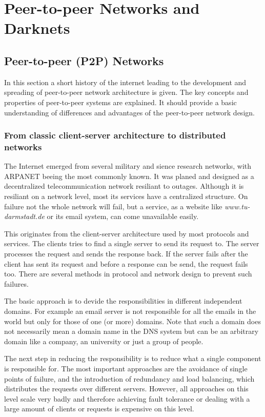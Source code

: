 \chapter{Peer-to-peer Networks and Darknets}


\section{Peer-to-peer (P2P) Networks}

In this section a short history of the internet leading to the development and spreading of peer-to-peer network architecture is given. The key concepts and properties of peer-to-peer systems are explained. It should provide a basic understanding of differences and advantages of the peer-to-peer network design.

\subsection{From classic client-server architecture to distributed networks}

The Internet emerged from several military and sience research networks, with ARPANET beeing the most commonly known. It was planed and designed as a decentralized telecommunication network resiliant to outages. Although it is resiliant on a network level, most its services have a centralized structure. On failure not the whole network will fail, but a service, as a website like \emph{www.tu-darmstadt.de} or its email system, can come unavailable easily.

This originates from the client-server architecture used by most protocols and services. The clients tries to find a single server to send its request to. The server processes the request and sends the response back. If the server fails after the client has sent its request and before a response can be send, the request fails too. There are several methods in protocol and network design to prevent such failures.

The basic approach is to devide the responsibilities in different independent domains. For example an email server is not responsible for all the emails in the world but only for those of one (or more) domains. Note that such a domain does not necessarily mean a domain name in the DNS system but can be an arbitrary domain like a company, an university or just a group of people.

The next step in reducing the responsibility is to reduce what a single component is responsible for. The most important approaches are the avoidance of single points of failure, and the introduction of redundancy and load balancing, which distributes the requests over different servers. However, all approaches on this level scale very badly and therefore achieving fault tolerance or dealing with a large amount of clients or requests is expensive on this level.

